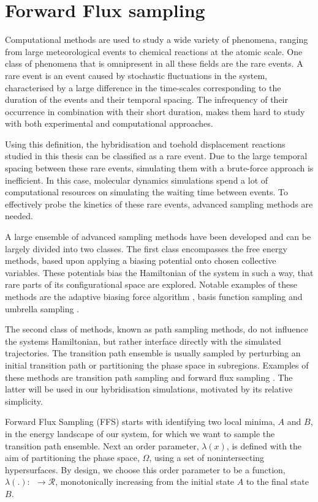 \section{Forward Flux sampling}

Computational methods are used to study a wide variety of phenomena, ranging from
large meteorological events to chemical reactions at the atomic scale. One class of
phenomena that is omnipresent in all these fields are the rare events. A rare event is an
event caused by stochastic fluctuations in the system, characterised by a large
difference in the time-scales corresponding to the duration of the events and their
temporal spacing. The infrequency of their occurrence in combination with their short
duration, makes them hard to study with both experimental and computational approaches.

Using this definition, the hybridisation and toehold displacement reactions studied in
this thesis can be classified as a rare event. Due to
the large temporal spacing between these rare events, simulating them with a brute-force
approach is inefficient. In this case, molecular dynamics simulations spend a lot of
computational resources on simulating the waiting time between events. To
effectively probe the kinetics of these rare events, advanced sampling methods are
needed.

A large ensemble of advanced sampling methods have been developed and can be largely
divided into two classes. The first class encompasses the free energy methods, based upon
applying a biasing potential onto chosen collective variables. These potentials bias the
Hamiltonian of the system in such a way, that rare parts of its configurational space are
explored. Notable examples of these methods are the adaptive biasing force algorithm
\cite{Comer2015}, basis function sampling\cite{Whitmer2014} and umbrella sampling
\cite{Kästner2011}.

The second class of methods, known as path sampling methods, do not influence the
systems Hamiltonian, but rather interface directly with the simulated trajectories. The
transition path ensemble is usually sampled by perturbing an initial transition path or
partitioning the phase space in subregions. Examples of these methods are transition
path sampling \cite{Dellago2002} and forward flux sampling \cite{Allen2006}
\cite{Allen2009}.  The latter
will be used in our
hybridisation simulations, motivated by its relative simplicity.

Forward Flux Sampling (FFS) starts with identifying two local minima, $A$ and $B$, in the
energy landscape of our system, for which we want to sample the transition path ensemble.
Next an order parameter, $\lambda(x)$, is defined with the aim of partitioning the
phase space, $\Omega$, using a set of nonintersecting hypersurfaces. By design, we
choose this order parameter to be a function, $\lambda(.):\ $\Omega$\ \rightarrow
\mathcal{R}$, monotonically increasing from the initial state $A$ to the final
state $B$.

